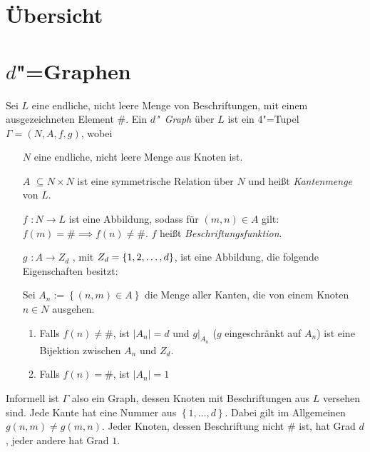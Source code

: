 \documentclass[11pt]{article}
\newcommand{\defWord}[1]{\emph{#1}}
\begin{document}
\clearpage


\section{Übersicht}

\section{$d$"=Graphen}
\begin{definition}[$d$"~Graph]
Sei $L$ eine endliche, nicht leere Menge von Beschriftungen, mit einem ausgezeichneten Element $\#$. 
Ein \defWord{$d$"~Graph} über $L$ ist ein 4"=Tupel $\Gamma = \left(N, A, f, g\right)$, wobei
\begin{itemize}
	\item[$N$] eine endliche, nicht leere Menge aus Knoten ist.
	\item[$A$] $\subseteq N \times N$ ist eine symmetrische Relation über $N$ und heißt \defWord{Kantenmenge} von $L$.
	\item[$f$] $: N \rightarrow L$ ist eine Abbildung, sodass für $\left(m, n\right) \in A$ gilt: $f(m) = \# \implies f(n) \neq \#$. $f$  heißt \defWord{Beschriftungsfunktion}.
	\item[$g$] $: A \rightarrow Z_d$ , mit $Z_d = \left \{1, 2,\text{\dots}, d \right \}$, ist eine Abbildung, die folgende Eigenschaften besitzt:
	
	Sei $A_n := \left \{\left(n, m\right) \in A\right \}$ die Menge aller Kanten, die von einem Knoten $n \in N$ ausgehen.
	\begin{enumerate}
		\item Falls $f(n) \neq \#$, ist $\left|A_n\right| = d$ und $g \vert_{A_n}$ ($g$ eingeschränkt auf $A_n$) ist eine Bijektion zwischen $A_n$ und $Z_d$.
		\item Falls $f(n) = \#$, ist $\left|A_n\right| = 1$
	\end{enumerate}
	
\end{itemize}
\end{definition}

Informell ist $\Gamma$ also ein Graph, dessen Knoten mit Beschriftungen aus $L$ versehen sind. 
Jede Kante hat eine Nummer aus $\left\{1, \dots, d\right\}$. 
Dabei gilt im Allgemeinen $g(n, m) \neq g(m, n)$. 
Jeder Knoten, dessen Beschriftung nicht $\#$ ist, hat Grad $d$, jeder andere hat Grad $1$. 
\end{document}

